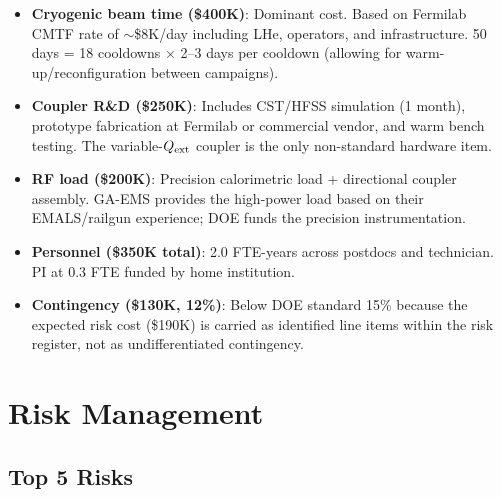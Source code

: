 \documentclass[11pt]{article}
\newcommand{\Qext}{Q_{\rm ext}}
\begin{document}
\begin{itemize}[nosep]
  \item \textbf{Cryogenic beam time (\$400K)}: Dominant cost. Based on
    Fermilab CMTF rate of $\sim$\$8K/day including LHe, operators,
    and infrastructure. 50 days = 18 cooldowns $\times$ 2--3 days
    per cooldown (allowing for warm-up/reconfiguration between
    campaigns).
  \item \textbf{Coupler R\&D (\$250K)}: Includes CST/HFSS simulation
    (1 month), prototype fabrication at Fermilab or commercial vendor,
    and warm bench testing. The variable-$\Qext$ coupler is the only
    non-standard hardware item.
  \item \textbf{RF load (\$200K)}: Precision calorimetric load +
    directional coupler assembly. GA-EMS provides the high-power load
    based on their EMALS/railgun experience; DOE funds the precision
    instrumentation.
  \item \textbf{Personnel (\$350K total)}: 2.0 FTE-years across
    postdocs and technician. PI at 0.3 FTE funded by home institution.
  \item \textbf{Contingency (\$130K, 12\%)}: Below DOE standard 15\%
    because the expected risk cost (\$190K) is carried as identified
    line items within the risk register, not as undifferentiated
    contingency.
\end{itemize}

\section{Risk Management}
\label{sec:risk}

\subsection{Top 5 Risks}
\end{document}
